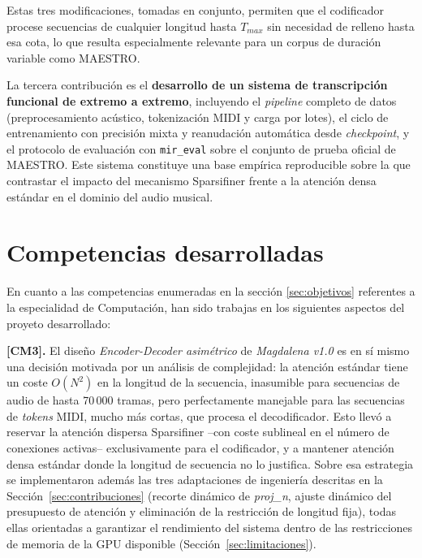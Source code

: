 Estas tres modificaciones, tomadas en conjunto, permiten que el
codificador procese secuencias de cualquier longitud hasta $T_{max}$
sin necesidad de relleno hasta esa cota, lo que resulta especialmente
relevante para un corpus de duración variable como MAESTRO.

La tercera contribución es el \textbf{desarrollo de un sistema de
transcripción funcional de extremo a extremo}, incluyendo el
\textit{pipeline} completo de datos (preprocesamiento acústico,
tokenización MIDI y carga por lotes), el ciclo de entrenamiento con
precisión mixta y reanudación automática desde \textit{checkpoint}, y
el protocolo de evaluación con \texttt{mir\_eval} sobre el conjunto de
prueba oficial de MAESTRO. Este sistema constituye una base empírica
reproducible sobre la que contrastar el impacto del mecanismo
Sparsifiner frente a la atención densa estándar en el dominio del audio
musical.
\clearpage

\section{Competencias desarrolladas}
\label{sec:competencias}

En cuanto a las competencias enumeradas en la sección \ref{sec:objetivos} referentes a la especialidad de Computación, han sido trabajas en los siguientes aspectos del proyeto desarrollado:

\textbf{[CM3].} El diseño \textit{Encoder-Decoder asimétrico} de
\textit{Magdalena v1.0} es en sí mismo una decisión motivada por un
análisis de complejidad: la atención estándar tiene un coste
$O(N^2)$ en la longitud de la secuencia, inasumible para secuencias
de audio de hasta 70\,000 tramas, pero perfectamente manejable para
las secuencias de \textit{tokens} MIDI, mucho más cortas, que procesa
el decodificador. Esto llevó a reservar la atención dispersa
Sparsifiner --con coste sublineal en el número de conexiones
activas-- exclusivamente para el codificador, y a mantener atención
densa estándar donde la longitud de secuencia no lo justifica. Sobre
esa estrategia se implementaron además las tres adaptaciones de
ingeniería descritas en la Sección~\ref{sec:contribuciones} (recorte
dinámico de \textit{proj\_n}, ajuste dinámico del presupuesto de
atención y eliminación de la restricción de longitud fija), todas
ellas orientadas a garantizar el rendimiento del sistema dentro de las
restricciones de memoria de la GPU disponible (Sección~\ref{sec:limitaciones}).

